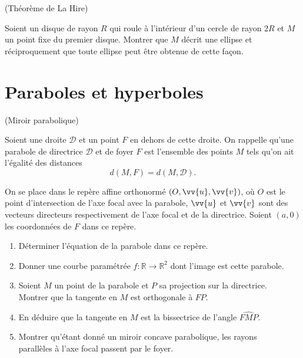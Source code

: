 \documentclass[a4paper,12pt,reqno]{amsart}
\begin{document}
\begin{exo} (Théorème de La Hire)


  Soient un disque de rayon $R$ qui roule à l'intérieur d'un cercle de rayon $2R$ et $M$ un point fixe du premier disque. Montrer que $M$ décrit une ellipse et réciproquement que toute ellipse peut être obtenue de cette façon.

\end{exo}


\section{Paraboles et hyperboles}

\begin{exo} (Miroir parabolique)


  Soient une droite $\mathcal{D}$ et un point $F$ en dehors de cette droite. On rappelle qu'une parabole de directrice $\mathcal{D}$ et de foyer $F$ est l'ensemble des points $M$ tels qu'on ait l'égalité des distances
  $$
    d(M,F)= d(M,\mathcal{D}).
  $$


  On se place dans le repère affine orthonormé $(O,\vv{u},\vv{v})$, où $O$ est le point d'intersection de l'axe focal avec la parabole, $\vv{u}$ et $\vv{v}$ sont des vecteurs directeurs respectivement de l'axe focal et de la directrice. Soient $(a,0)$ les coordonnées de $F$ dans ce repère.

  \begin{enumerate}

    \item Déterminer l'équation de la parabole dans ce repère.

    \item Donner une courbe paramétrée $f:\mathbb{R}\to\mathbb{R}^{2}$ dont l'image est cette parabole.

    \item Soient $M$ un point de la parabole et $P$ sa projection sur la directrice.\\
    Montrer que la tangente en $M$ est orthogonale à $FP$.

    \item En déduire que la tangente en $M$ est la bissectrice de l'angle $\widehat{FMP}$.

    \item Montrer qu'étant donné un miroir concave parabolique, les rayons\\
    parallèles à l'axe focal passent par le foyer.
  \end{enumerate}

\end{exo}
\end{document}
